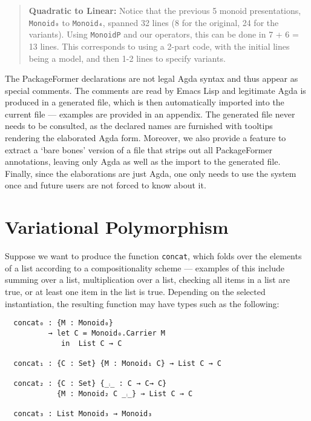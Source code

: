 \documentclass[sigplan,screen]{acmart}
\begin{document}
\begin{quote}
\textbf{Quadratic to Linear:}
Notice that the previous 5 monoid presentations, \texttt{Monoid₀} to \texttt{Monoid₄}, spanned 32
lines (8 for the original, 24 for the variants). Using \texttt{MonoidP} and our operators,
this can be done in 7 + 6 = 13 lines.  This corresponds to using a 2-part code,
with the initial lines being a model, and then 1-2 lines to specify variants.
\end{quote}

The PackageFormer declarations are not legal Agda syntax and thus appear as special comments.
The comments are read by Emacs Lisp and legitimate Agda is produced in a generated file, which is
then automatically imported into the current file --- examples are provided in an appendix.
The generated file never needs to be consulted,
as the declared names are furnished with tooltips rendering the elaborated
Agda form. Moreover, we also provide a feature to extract a ‘bare bones’ version
of a file that strips out all PackageFormer annotations, leaving only Agda
as well as the import to the generated file. Finally, since the elaborations are
just Agda, one only needs to use the system once and future users are
not forced to know about it.

\section{\textsf{\upshape Variational} Polymorphism}
\label{sec:orgac5f537}
Suppose we want to produce the function \texttt{concat}, which folds over the elements of a list
according to a compositionality scheme --- examples of this include summing over
a list, multiplication over a list, checking all items in a list are true, or
at least one item in the list is true.
Depending on the selected instantiation,
the resulting function may have types such as the following:

\vspace{1em}
\begin{verbatim}
  concat₀ : {M : Monoid₀}
          → let C = Monoid₀.Carrier M
             in  List C → C

  concat₁ : {C : Set} {M : Monoid₁ C} → List C → C

  concat₂ : {C : Set} {_⨾_ : C → C→ C}
            {M : Monoid₂ C _⨾_} → List C → C

  concat₃ : List Monoid₃ → Monoid₃
\end{verbatim}
\vspace{1em}
\end{document}
